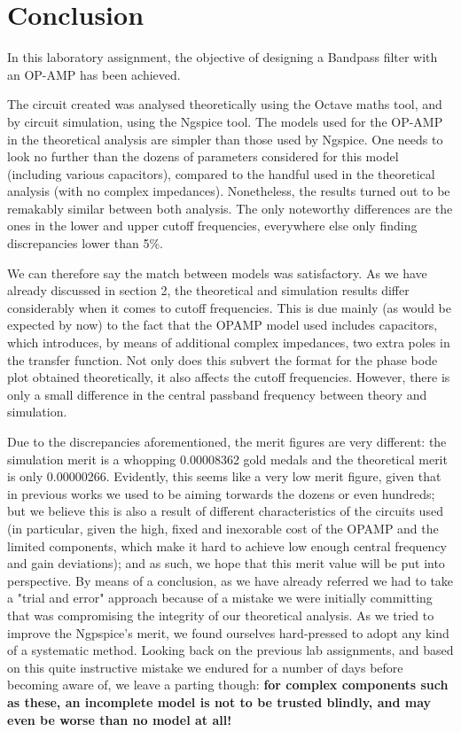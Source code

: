\section{Conclusion}
\label{sec:conclusion}

In this laboratory assignment, the objective of designing a Bandpass filter with an OP-AMP has been achieved.\par
The circuit created was analysed theoretically using the Octave maths tool, and by circuit simulation, using the
Ngspice tool. The models used for the OP-AMP in the theoretical analysis are simpler than those used by Ngspice. One needs to look no further than the dozens of parameters considered for this model (including various capacitors), compared to the handful used in the theoretical analysis (with no complex impedances). Nonetheless, the results turned out to be remakably similar between both analysis. The only noteworthy differences are the ones in the lower and upper cutoff frequencies, everywhere else only finding discrepancies lower than 5\%.

We can therefore say the match between models was satisfactory. As we have already discussed in section 2, the theoretical and simulation results differ considerably when it comes to cutoff frequencies. This is due mainly (as would be expected by now) to the fact that the OPAMP model used includes capacitors, which introduces, by means of additional complex impedances, two extra poles in the transfer function. Not only does this subvert the format for the phase bode plot obtained theoretically, it also affects the cutoff frequencies. However, there is only a small difference in the central passband frequency between theory and simulation.

Due to the discrepancies aforementioned, the merit figures are very different: the simulation merit is a whopping 0.00008362 gold medals and the theoretical merit is only 0.00000266. Evidently, this seems like a very low merit figure, given that in previous works we used to be aiming torwards the dozens or even hundreds; but we believe this is also a result of different characteristics of the circuits used (in particular, given the high, fixed and inexorable cost of the OPAMP and the limited components, which make it hard to achieve low enough central frequency and gain deviations); and as such, we hope that this merit value will be put into perspective. 
By means of a conclusion, as we have already referred we had to take a "trial and error" approach because of a mistake we were initially committing that was compromising the integrity of our theoretical analysis. As we tried to improve the Ngpspice's merit, we found ourselves hard-pressed to adopt any kind of a systematic method. Looking back on the previous lab assignments, and based on this quite instructive mistake we endured for a number of days before becoming aware of, we leave a parting though: \textbf{for complex components such as these, an incomplete model is not to be trusted blindly, and may even be worse than no model at all!}\par


